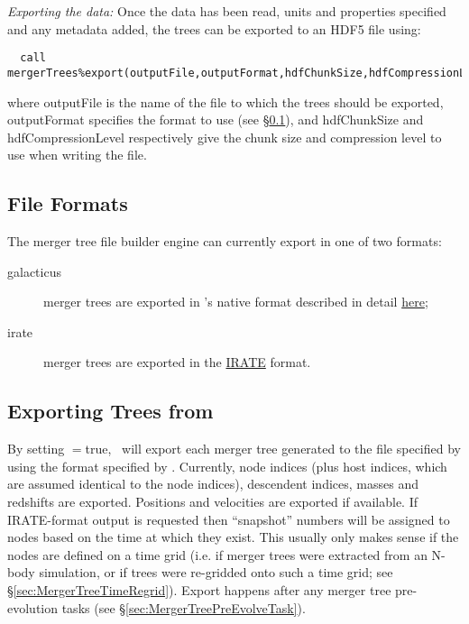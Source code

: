 \noindent \emph{Exporting the data:} Once the data has been read, units and properties specified and any metadata added, the trees can be exported to an HDF5 file using:
\begin{verbatim}
  call mergerTrees%export(outputFile,outputFormat,hdfChunkSize,hdfCompressionLevel)
\end{verbatim}
where {\normalfont \ttfamily outputFile} is the name of the file to which the trees should be exported, {\normalfont \ttfamily outputFormat} specifies the format to use (see \S\ref{sec:mergerTreeBuilderFileFormats}), and {\normalfont \ttfamily hdfChunkSize} and {\normalfont \ttfamily hdfCompressionLevel} respectively give the chunk size and compression level to use when writing the file.

\subsection{File Formats}\label{sec:mergerTreeBuilderFileFormats}

The merger tree file builder engine can currently export in one of two formats:
\begin{description}
 \item [{\normalfont \ttfamily galacticus}] merger trees are exported in \glc's native format described in detail \href{https://github.com/galacticusorg/galacticus/wiki/Merger-Tree-File-Format}{here};
 \item [{\normalfont \ttfamily irate}] merger trees are exported in the \href{https://bitbucket.org/eteq/irate-format}{\normalfont \ttfamily IRATE} format.
\end{description}

\subsection{Exporting Trees from \glc}

By setting {\normalfont \ttfamily [mergerTreesWrite]}$=${\normalfont \ttfamily true}, \glc\ will export each merger tree generated to the file specified by {\normalfont \ttfamily [mergerTreeExportFileName]} using the format specified by {\normalfont \ttfamily [mergerTreeExportOutputFormat]}. Currently, node indices (plus host indices, which are assumed identical to the node indices), descendent indices, masses and redshifts are exported. Positions and velocities are exported if available. If {\normalfont \ttfamily IRATE}-format output is requested then ``snapshot'' numbers will be assigned to nodes based on the time at which they exist. This usually only makes sense if the nodes are defined on a time grid (i.e. if merger trees were extracted from an N-body simulation, or if trees were re-gridded onto such a time grid; see \S\ref{sec:MergerTreeTimeRegrid}). Export happens after any merger tree pre-evolution tasks (see \S\ref{sec:MergerTreePreEvolveTask}).
